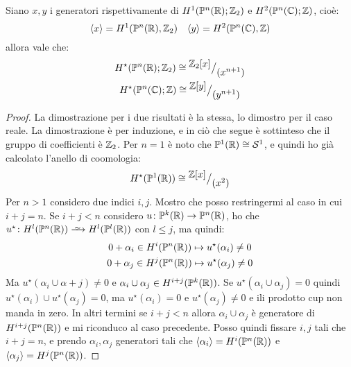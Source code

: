 \begin{theorem}
  Siano $ x, y $ i generatori rispettivamente di $ H^1(\mathbb{P}^n (\mathbb{R}); \mathbb{Z}_2) $ e $ H^2(\mathbb{P}^n (\mathbb{C}); \mathbb{Z}) $,
  cioè:
  \[
    \langle x \rangle = H^1(\mathbb{P}^n (\mathbb{R}), \mathbb{Z}_2)  \quad \langle y \rangle = H^2(\mathbb{P}^n (\mathbb{C}), \mathbb{Z})
  \]
  allora vale che:
  \begin{gather*}
    H^\star(\mathbb{P}^n (\mathbb{R}); \mathbb{Z}_2) \cong {^{\textstyle \mathbb{Z}_2[x]}\big/_{\textstyle (x^{n+1})}} \\
    H^\star(\mathbb{P}^n (\mathbb{C}); \mathbb{Z}) \cong {^{\textstyle \mathbb{Z}[y]}\big/_{\textstyle (y^{n+1})}}
  \end{gather*}
\end{theorem}
\begin{proof}
  La dimostrazione per i due risultati è la stessa, lo dimostro per il caso
  reale. La dimostrazione è per induzione, e in ciò che segue è sottinteso che
  il gruppo di coefficienti è $ \mathbb{Z}_2 $.
  Per $ n = 1 $ è noto che $ \mathbb{P}^1 (\mathbb{R}) \cong \mathcal{S}^{1} $, e quindi ho già calcolato
  l'anello di coomologia:
  \[
    H^\star(\mathbb{P}^1 (\mathbb{R})) \cong {^{\textstyle \mathbb{Z}[x]}\big/_{\textstyle (x^2)}}
  \]
  Per $ n > 1 $ considero due indici $ i, j $. Mostro che posso restringermi al
  caso in cui $ i + j = n $. Se $ i + j < n $ considero
  $ u \colon \mathbb{P}^k (\mathbb{R}) \to \mathbb{P}^n (\mathbb{R}) $, ho che $ u^\star \colon H^l(\Pjr{n}) \homoto H^l(\Pjr{l}) $
  con $ l \leq j $, ma quindi:
  \begin{gather*}
    0 + \alpha_i \in H^i(\mathbb{P}^n (\mathbb{R})) \mapsto u^\star(\alpha_i) \not = 0 \\
    0 + \alpha_j \in H^j(\mathbb{P}^n (\mathbb{R})) \mapsto u^\star(\alpha_j) \not = 0
  \end{gather*}
  Ma $ u^\star(\alpha_i \cup \alpha+j) \not = 0 $ e $ \alpha_i \cup \alpha_j \in H^{i+j}(\mathbb{P}^k (\mathbb{R})) $. Se $
  u^\star(\alpha_i \cup \alpha_j) = 0 $ quindi $ u^\star(\alpha_i) \cup u^\star(\alpha_j) = 0 $, ma $ u^\star(\alpha_i) = 0 $
  e $ u^\star(\alpha_j) \not = 0 $ e ili prodotto cup non manda in zero. In altri termini
  se $ i + j < n $ allora $ \alpha_i \cup \alpha_j $ è generatore di $ H^{i+j}(\mathbb{P}^n (\mathbb{R})) $ e
  mi riconduco al caso precedente. Posso quindi fissare $ i, j $ tali che $ i +
  j = n $, e prendo $ \alpha_i, \alpha_j $ generatori tali che $ \langle\alpha_i\rangle = H^i(\mathbb{P}^n (\mathbb{R})) $ e
  $ \langle\alpha_j\rangle = H^j(\mathbb{P}^n (\mathbb{R})) $.


\end{proof}

